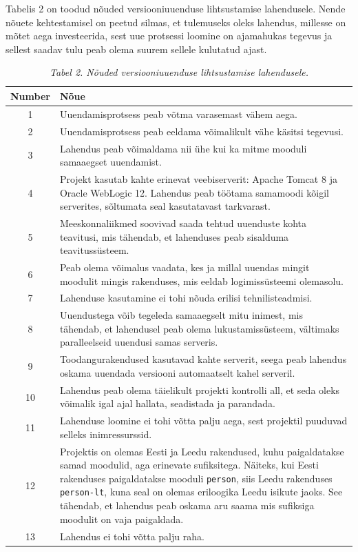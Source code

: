 \documentclass[12pt]{article}
\newcommand{\code}[1]{\texttt{#1}}
\begin{document}
  Tabelis 2 on toodud nõuded versiooniuuenduse lihtsustamise lahendusele. Nende nõuete kehtestamisel on peetud silmas, et tulemuseks oleks lahendus, millesse on mõtet aega investeerida, sest uue protsessi loomine on ajamahukas tegevus ja sellest saadav tulu peab olema suurem sellele kulutatud ajast.
  
  \begin{table}
    \caption*{\textit{Tabel 2. Nõuded versiooniuuenduse lihtsustamise lahendusele.}}
    
    \begin{tabular}{|c|p{11cm}|}
      \hline
      \textbf{Number} & \textbf{Nõue}\\
      \hline
      1 & Uuendamisprotsess peab võtma varasemast vähem aega.\\
      \hline
      2 & Uuendamisprotsess peab eeldama võimalikult vähe käsitsi tegevusi.\\
      \hline
      3 & Lahendus peab võimaldama nii ühe kui ka mitme mooduli samaaegset uuendamist.\\
      \hline
      4 & Projekt kasutab kahte erinevat veebiserverit: Apache Tomcat 8 ja Oracle WebLogic 12. Lahendus peab töötama samamoodi kõigil serverites, sõltumata seal kasutatavast tarkvarast.\\
      \hline
      5 & Meeskonnaliikmed soovivad saada tehtud uuenduste kohta teavitusi, mis tähendab, et lahenduses peab sisalduma teavitussüsteem.\\
      \hline
      6 & Peab olema võimalus vaadata, kes ja millal uuendas mingit moodulit mingis rakenduses, mis eeldab logimissüsteemi olemasolu.\\
      \hline
      7 & Lahenduse kasutamine ei tohi nõuda erilisi tehnilisteadmisi.\\
      \hline
      8 & Uuendustega võib tegeleda samaaegselt mitu inimest, mis tähendab, et lahendusel peab olema lukustamissüsteem, vältimaks paralleelseid uuendusi samas serveris.\\
      \hline
      9 & Toodangurakendused kasutavad kahte serverit, seega peab lahendus oskama uuendada versiooni automaatselt kahel serveril.\\
      \hline
      10 & Lahendus peab olema täielikult projekti kontrolli all, et seda oleks võimalik igal ajal hallata, seadistada ja parandada.\\
      \hline
      11 & Lahenduse loomine ei tohi võtta palju aega, sest projektil puuduvad selleks inimressurssid.\\
      \hline
      12 & Projektis on olemas Eesti ja Leedu rakendused, kuhu paigaldatakse samad moodulid, aga erinevate sufiksitega. Näiteks, kui Eesti rakenduses paigaldatakse mooduli \code{person}, siis Leedu rakenduses \code{person-lt}, kuna seal on olemas eriloogika Leedu isikute jaoks. See tähendab, et lahendus peab oskama aru saama mis sufiksiga moodulit on vaja paigaldada.\\
      \hline
      13 & Lahendus ei tohi võtta palju raha.\\
      \hline
    \end{tabular}
  \end{table}
  
\end{document}
